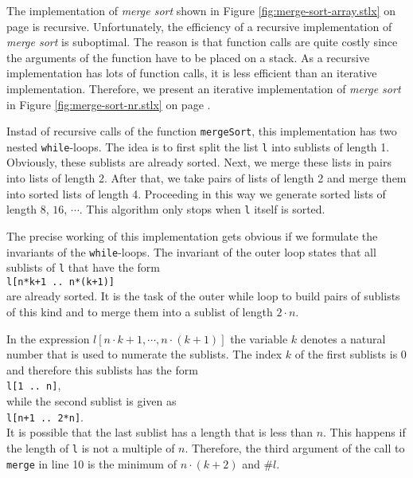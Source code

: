 \noindent
The implementation of \emph{merge sort} shown in Figure \ref{fig:merge-sort-array.stlx} on page
\pageref{fig:merge-sort-array.stlx} is recursive.  Unfortunately, the efficiency of a recursive
implementation of \emph{merge sort} is suboptimal.  The reason is that function calls are quite
costly since the arguments of the function have to be placed on a stack.  As a recursive
implementation has lots of function calls, it is less efficient than an iterative implementation.
Therefore, we present an iterative implementation of \emph{merge sort} in Figure
\ref{fig:merge-sort-nr.stlx} on page \pageref{fig:merge-sort-nr.stlx}.

Instad of recursive calls of the function \texttt{mergeSort}, this implementation has two nested 
\texttt{while}-loops.  The idea is to first split the list \texttt{l} into sublists of length 1.
Obviously, these sublists are already sorted.  Next, we merge these lists in pairs into lists of
length 2.  After that, we take pairs of lists of length 2 and merge them into sorted lists of length
4. Proceeding in this way we generate sorted lists of length
$8$, $16$, $\cdots$.  This algorithm only stops when \texttt{l} itself is sorted.

The precise working of this implementation gets obvious if we formulate the invariants of the
\texttt{while}-loops.  The invariant of the outer loop states that all sublists of \texttt{l} 
that have the form
\\[0.2cm]
\hspace*{1.3cm}
\texttt{l[n*k+1 .. n*(k+1)]}
\\[0.2cm]
are already sorted.  It is the task of the outer while loop to build pairs of sublists of this kind
and to merge them into a sublist of length $2 \cdot n$.

In the expression $l[n \cdot k + 1, \cdots, n \cdot (k+1)]$ the variable $k$ denotes a natural
number that is used to numerate the sublists.  The index $k$ of the first sublists is $0$ and
therefore this sublists has the form
\\[0.2cm]
\hspace*{1.3cm}
\texttt{l[1 .. n]},
\\[0.2cm]
while the second sublist is given as
\\[0.2cm]
\hspace*{1.3cm}
\texttt{l[n+1 .. 2*n]}.
\\[0.2cm]
It is possible that the last sublist has a length that is less than $n$.  This happens if the length
of \texttt{l} is not a multiple of $n$.  Therefore, the third argument of the call to \texttt{merge}
in line 10 is the minimum of $n\cdot(k+2)$ and $\mathtt{\#}l$.

